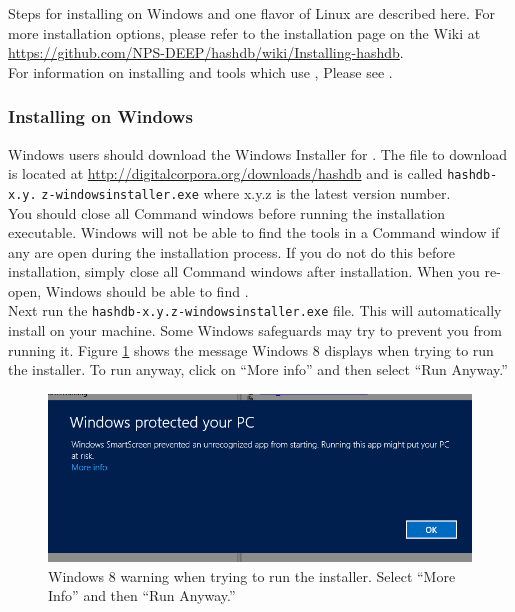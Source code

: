 \documentclass[11pt,fleqn]{article} %
\begin{document}
Steps for installing \hdb on Windows and one flavor of Linux are described here. For more installation options, please refer to the installation page on the \hdb Wiki at \url{https://github.com/NPS-DEEP/hashdb/wiki/Installing-hashdb}.\\

For information on installing \sscope and \bulk tools which use \hdb, Please see \textbf{}.\\

\subsubsection{Installing on Windows}
Windows users should download the Windows Installer for \hdb. The file to download is located at \url{http://digitalcorpora.org/downloads/hashdb} and is called \texttt{hashdb-x.y.} \texttt{z-windowsinstaller.exe} where x.y.z is the latest version number.\\

You should close all Command windows before running the installation executable. Windows will not be able to find the \hdb tools in a Command window if any are open during the installation process. If you do not do this before installation, simply close all Command windows after installation. When you re-open, Windows should be able to find \hdb.\\

 Next run the \texttt{hashdb-x.y.z-windowsinstaller.exe} file. This will automatically install \hdb on your machine. Some Windows safeguards may try to prevent you from running it. Figure \ref{fig:windowsWarning} shows the message Windows 8 displays when trying to run the installer. To run anyway, click on ``More info'' and then select ``Run Anyway.'' \\
\begin{figure}
	\center
	\includegraphics[scale=.5]{windowsWarning.png}
	\caption{Windows 8 warning when trying to run the installer. Select ``More Info'' and then ``Run Anyway.''}
	\label{fig:windowsWarning}
\end{figure}
\end{document}
